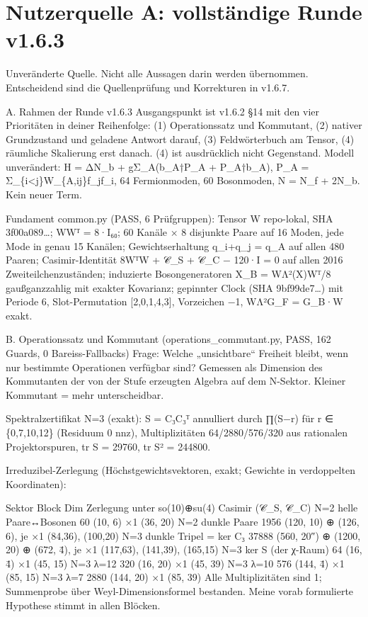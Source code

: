 \section{Nutzerquelle A: vollständige Runde
v1.6.3}\label{nutzerquelle-a-vollstuxe4ndige-runde-v1.6.3}

Unveränderte Quelle. Nicht alle Aussagen darin werden übernommen.
Entscheidend sind die Quellenprüfung und Korrekturen in v1.6.7.

A. Rahmen der Runde v1.6.3 Ausgangspunkt ist v1.6.2 §14 mit den vier
Prioritäten in deiner Reihenfolge: (1) Operationssatz und Kommutant, (2)
nativer Grundzustand und geladene Antwort darauf, (3) Feldwörterbuch am
Tensor, (4) räumliche Skalierung erst danach. (4) ist ausdrücklich nicht
Gegenstand. Modell unverändert: H = ΔN\_b + gΣ\_A(b\_A†P\_A +
P\_A†b\_A), P\_A = Σ\_\{i\textless j\}W\_\{A,ij\}f\_jf\_i, 64
Fermionmoden, 60 Bosonmoden, N = N\_f + 2N\_b. Kein neuer Term.

Fundament common.py (PASS, 6 Prüfgruppen): Tensor W repo-lokal, SHA
3f00a089\ldots; WWᵀ = 8·I₆₀; 60 Kanäle × 8 disjunkte Paare auf 16 Moden,
jede Mode in genau 15 Kanälen; Gewichtserhaltung q\_i+q\_j = q\_A auf
allen 480 Paaren; Casimir-Identität 8WᵀW + 𝒞\_S + 𝒞\_C − 120·I = 0 auf
allen 2016 Zweiteilchenzuständen; induzierte Bosongeneratoren X\_B =
WΛ²(X)Wᵀ/8 gaußganzzahlig mit exakter Kovarianz; gepinnter Clock (SHA
9bf99de7\ldots) mit Periode 6, Slot-Permutation {[}2,0,1,4,3{]},
Vorzeichen −1, WΛ²G\_F = G\_B·W exakt.

B. Operationssatz und Kommutant (operations\_commutant.py, PASS, 162
Guards, 0 Bareiss-Fallbacks) Frage: Welche „unsichtbare`` Freiheit
bleibt, wenn nur bestimmte Operationen verfügbar sind? Gemessen als
Dimension des Kommutanten der von der Stufe erzeugten Algebra auf dem
N-Sektor. Kleiner Kommutant = mehr unterscheidbar.

Spektralzertifikat N=3 (exakt): S = C₃C₃ᵀ annulliert durch ∏(S−r) für r
∈ \{0,7,10,12\} (Residuum 0 nnz), Multiplizitäten 64/2880/576/320 aus
rationalen Projektorspuren, tr S = 29760, tr S² = 244800.

Irreduzibel-Zerlegung (Höchstgewichtsvektoren, exakt; Gewichte in
verdoppelten Koordinaten):

Sektor Block Dim Zerlegung unter so(10)⊕\allowbreak{}su(4) Casimir (𝒞\_S, 𝒞\_C) N=2
helle Paare↔Bosonen 60 (10, 6) ×1 (36, 20) N=2 dunkle Paare 1956 (120,
10) ⊕\allowbreak{} (126, 6), je ×1 (84,36), (100,20) N=3 dunkle Tripel = ker C₃ 37888
(560, 20″) ⊕\allowbreak{} (1200, 20) ⊕\allowbreak{} (672, 4̄), je ×1 (117,63), (141,39), (165,15)
N=3 ker S (der χ-Raum) 64 (16, 4̄) ×1 (45, 15) N=3 λ=12 320 (16, 20) ×1
(45, 39) N=3 λ=10 576 (144, 4̄) ×1 (85, 15) N=3 λ=7 2880 (144, 20) ×1
(85, 39) Alle Multiplizitäten sind 1; Summenprobe über
Weyl-Dimensionsformel bestanden. Meine vorab formulierte Hypothese
stimmt in allen Blöcken.

